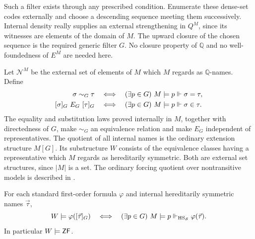 Such a filter exists through any prescribed condition. Enumerate
these dense-set codes externally and choose a descending sequence
meeting them successively. Internal density really supplies an
external strengthening in $Q^M$, since its witnesses are elements
of the domain of $M$. The upward closure of the chosen sequence
is the required generic filter $G$. No closure property of
$\mathbb Q$ and no well-foundedness of $E^M$ are needed here.

Let $\mathcal N^M$ be the external set of elements of $M$ which
$M$ regards as $\mathbb Q$-names. Define
\begin{align}
 \sigma\sim_G\tau
 &\quad\Longleftrightarrow\quad
   (\exists p\in G)\ M\models p\Vdash\sigma=\tau,
 \label{eq:internal-name-equivalence}\\
 [\sigma]_G\ E_G\ [\tau]_G
 &\quad\Longleftrightarrow\quad
   (\exists p\in G)\ M\models p\Vdash\sigma\in\tau.
 \label{eq:internal-name-membership}
\end{align}
The equality and substitution laws proved internally in $M$,
together with directedness of $G$, make $\sim_G$ an equivalence
relation and make $E_G$ independent of representatives.
The quotient of all internal names is the ordinary extension
structure $M[G]$. Its substructure $W$ consists of the equivalence
classes having a representative which $M$ regards as hereditarily
symmetric. Both are external set structures, since $|M|$ is a set.
The ordinary forcing quotient over nontransitive models is
described in \cite[Section~4, p.~12]{Williams2019}.

\begin{lemma}
\label{lem:arbitrary-model-symmetric-truth}
For each standard first-order formula $\varphi$ and internal
hereditarily symmetric names $\vec\tau$,
\[
 W\models\varphi([\vec\tau]_G)
 \quad\Longleftrightarrow\quad
 (\exists p\in G)\ M\models
      p\Vdash_{\mathrm{HS}_{\mathcal S}}\varphi(\vec\tau).
\]
In particular $W\models\mathsf{ZF}$.
\end{lemma}

